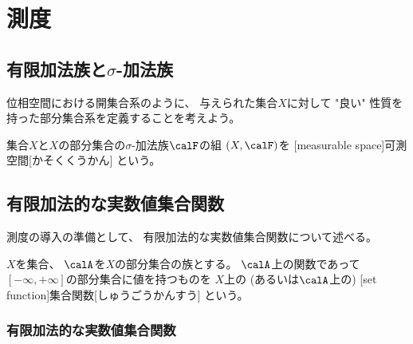 \documentclass[report]{jlreq}
\begin{document}
%
\chapter{測度}

%
\section{
    \texorpdfstring{%
        有限加法族と$\sigma$-加法族%
    }{%
        有限加法族と sigma 加法族%
    }%
}

位相空間における開集合系のように、
与えられた集合$X$に対して "良い" 性質を持った部分集合系を定義することを考えよう。

\begin{definition}[有限加法族]
    \TODO{}
\end{definition}

\begin{definition}
    \TODO{}
\end{definition}

\begin{definition}[可測空間]
    集合$X$と$X$の部分集合の$\sigma$-加法族$\calF$の組
    $(X, \calF)$を
    [measurable space]{可測空間}[かそくくうかん]
    という。
\end{definition}

%
\section{有限加法的な実数値集合関数}

測度の導入の準備として、
有限加法的な実数値集合関数について述べる。

\begin{definition}[集合関数]
    $X$を集合、
    $\calA$を$X$の部分集合の族とする。
    $\calA$上の関数であって
    $[-\infty, +\infty]$の部分集合に値を持つものを
    $X$上の (あるいは$\calA$上の)
    [set function]{集合関数}[しゅうごうかんすう]
    という。
\end{definition}

\subsection{有限加法的な実数値集合関数}
\end{document}
